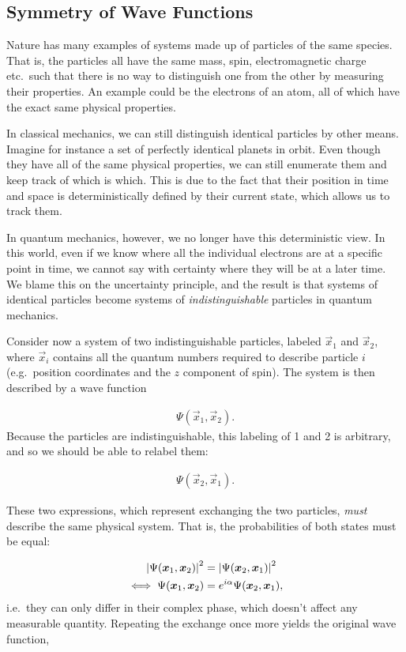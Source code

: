 \documentclass[Thesis.tex]{subfiles}
\begin{document}
\subsection{Symmetry of Wave Functions}

Nature has many examples of systems made up of particles of the same
species. That is, the particles all have the same mass, spin, electromagnetic
charge etc.\ such that there is no way to  distinguish one from the other by
measuring their properties. An example could be the electrons of an atom, all of
which have the exact same physical properties.

In classical mechanics, we can still distinguish identical particles by other
means. Imagine for instance a set of perfectly identical planets in orbit. Even
though they have all of the same physical properties, we can still enumerate
them and keep track of which is which. This is due to the fact that their
position in time and space is deterministically defined by their current state,
which allows us to track them.

In quantum mechanics, however, we no longer have this deterministic view. In
this world, even if we know where all the individual electrons are at a specific
point in time, we cannot say with certainty where they will be at a later
time. We blame this on the uncertainty principle, and the result is that systems of
identical particles become systems of \emph{indistinguishable} particles in
quantum mechanics.

Consider now a system of two indistinguishable particles, labeled $\vec x_1$ and
$\vec x_2$, where $\vec x_i$ contains all the quantum numbers required to describe
particle $i$ (e.g.\ position coordinates and the $z$ component of spin). The
system is then described by a wave function

\begin{align}
    \Psi(\vec x_1, \vec x_2).
\end{align}
Because the particles are indistinguishable, this labeling of 1 and 2 is
arbitrary, and so we should be able to relabel them:

\begin{align}
    \Psi(\vec x_2, \vec x_1).
\end{align}

These two expressions, which represent exchanging the two particles, \emph{must}
describe the same physical system. That is, the probabilities of both states
must be equal:

\begin{align}
    \abs{\Psi(\bm{x}_1, \bm{x}_2)}^2 &= \abs{\Psi(\bm{x}_2, \bm{x}_1)}^2\\
    \iff \Psi(\bm{x}_1,\bm{x}_2) &= e^{i\alpha}\Psi(\bm{x}_2, \bm{x}_1),
\end{align}
i.e.\ they can only differ in their complex phase, which doesn't affect any measurable
quantity. Repeating the exchange once more yields the original wave function,
\end{document}
